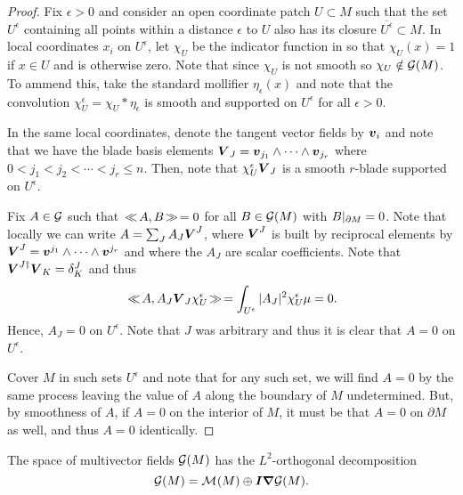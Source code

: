 \begin{proof}
Fix $\epsilon>0$ and consider an open coordinate patch $U \subset M$ such that the set $U^\epsilon$ containing all points within a distance $\epsilon$ to $U$ also has its closure $\overline{U^\epsilon}\subset M$. In local coordinates $x_i$ on $U^\epsilon$, let $\chi_U$ be the indicator function in so that $\chi_U(x)=1$ if $x\in U$ and is otherwise zero. Note that since $\chi_U$ is not smooth so $\chi_U \notin \mathcal{G}(M)$. To ammend this, take the standard mollifier \cite[\S C.4]{noauthor_evans_nodate} $\eta_\epsilon(x)$ and note that the convolution $\chi_U^\epsilon = \chi_U \ast \eta_\epsilon$ is smooth and supported on $U^\epsilon$ for all $\epsilon>0$. 

In the same local coordinates, denote the tangent vector fields by $\boldsymbol{v}_i$ and note that we have the blade basis elements $\boldsymbol{V}_J = \boldsymbol{v}_{j_1}\wedge \cdots \wedge \boldsymbol{v}_{j_r}$ where $0<j_1<j_2<\cdots <j_r\leq n$. Then, note that $\chi_U^\epsilon \boldsymbol{V}_J$ is a smooth $r$-blade supported on $U^\epsilon$. 

Fix $A\in \mathcal{G}$ such that $\hspace*{.5mm}\ll \hspace*{-.5mm} A, B \hspace*{-.5mm}\gg \hspace*{.5mm}=0$ for all $B\in \mathcal{G}(M)$ with $B\vert_{\partial M} =0$. Note that locally we can write $A = \sum_{J} A_J \boldsymbol{V}^J$, where $\boldsymbol{V}^J$ is built by reciprocal elements by $\boldsymbol{V}^J = \boldsymbol{v}^{j_1}\wedge \cdots \wedge \boldsymbol{v}^{j_r}$ and where the $A_J$ are scalar coefficients. Note that $\boldsymbol{V}^{J \dagger} \boldsymbol{V}_K = \delta^J_K$ \cite[eq. (3.19)]{hestenes_clifford_1984} and thus
\begin{equation}
\hspace*{.5mm}\ll \hspace*{-.5mm} A, A_J\boldsymbol{V}_J\chi_U^\epsilon \hspace*{-.5mm}\gg \hspace*{.5mm} = \int_{U^\epsilon} |A_J|^2 \chi_U^\epsilon \mu = 0.
\end{equation}
Hence, $A_J=0$ on $U^\epsilon$. Note that $J$ was arbitrary and thus it is clear that $A=0$ on $U^\epsilon$.

Cover $M$ in such sets $U^\epsilon$ and note that for any such set, we will find $A=0$ by the same process leaving the value of $A$ along the boundary of $M$ undetermined. But, by smoothness of $A$, if $A=0$ on the interior of $M$, it must be that $A=0$ on $\partial M$ as well, and thus $A=0$ identically.
\end{proof}
\begin{theorem}
\label{thm:monogenic_hodge}
The space of multivector fields $\mathcal{G}(M)$ has the $L^2$-orthogonal decomposition
\begin{equation}
\mathcal{G}(M) = \mathcal{M}^{}(M) \oplus \boldsymbol{I} \boldsymbol{\nabla} \mathcal{G}(M).
\end{equation}
\end{theorem}
